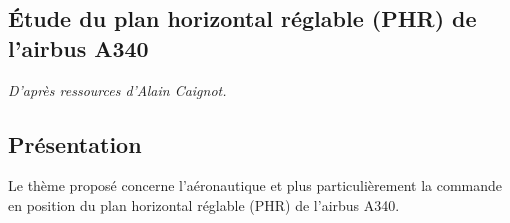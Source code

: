 \documentclass[10pt,fleqn]{article} %
\begin{document}
\begin{multicols}{2}
\newpage
\setcounter{exo}{0}
\section*{Étude du plan horizontal réglable (PHR) de l'airbus A340}


\begin{flushright}
\textit{D'après ressources d'Alain Caignot.}
\end{flushright}
\subsection*{Présentation}
Le thème proposé concerne l'aéronautique et plus particulièrement la commande en position du plan horizontal réglable (PHR) de l'airbus A340. 

%
%
%
%

\end{multicols}
\end{document}
